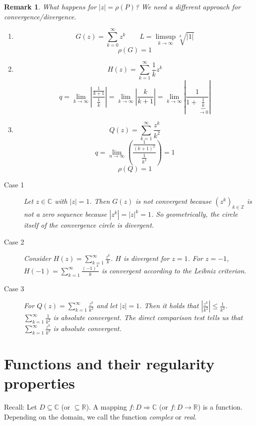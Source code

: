 \documentclass[a4paper,landscape,twocolumn]{article}
\newtheorem{rem}{Remark}
\newcommand\abs[1]{\left|#1\right|}
\begin{document}
\begin{rem}
  What happens for $\abs{z} = \rho(P)$?
  We need a different approach for convergence/divergence.
  \begin{enumerate}
    \item
      \[ G(z) = \sum_{k=0}^\infty z^k \qquad L = \limsup_{k\to\infty} \sqrt[k]{\abs{1}} \]
      \[ \rho(G) = 1 \]
    \item
      \[ H(z) = \sum_{k=1}^\infty \frac1k z^k \]
      \[
        q =
        \lim_{k\to\infty} \abs{\frac{\frac1{k+1}}{\frac1k}}
        = \lim_{k\to\infty} \abs{\frac{k}{k+1}}
        = \lim_{k\to\infty} \abs{\frac{1}{1 + \underbrace{\frac1k}_{\to0}}}
      \]
    \item
      \[ Q(z) = \sum_{k=1}^\infty \frac{z^k}{k^2} \]
      \[ q = \lim_{n\to\infty} \left(\frac{\frac{1}{(k+1)^2}}{\frac1{k^2}}\right) = 1 \]
      \[ \rho(Q) = 1 \]
  \end{enumerate}

  \begin{description}
    \item[Case 1]
      Let $z \in \mathbb C$ with $\abs{z} = 1$. Then $G(z)$ is not convergent
      because $(z^k)_{k\in\mathbb Z}$ is not a zero sequence because $\abs{z^k} = \abs{z}^k = 1$.
      So geometrically, the circle itself of the convergence circle is divergent.
    \item[Case 2]
      Consider $H(z) = \sum_{k=1}^\infty \frac{z^k}{k}$.
      $H$ is divergent for $z = 1$.
      For $z = -1$, $H(-1) = \sum_{k=1}^\infty \frac{(-1)^k}{k}$ is convergent according to the Leibniz criterion.
    \item[Case 3]
      For $Q(z) = \sum_{k=1}^\infty \frac{z^k}{k^2}$ and let $\abs{z} = 1$.
      Then it holds that $\abs{\frac{z^k}{k^2}} \leq \frac{1}{k^2}$.
      $\sum_{k=1}^\infty \frac{1}{k^2}$ is absolute convergent.
      The direct comparison test tells us that $\sum_{k=1}^\infty \frac{z^k}{k^2}$ is absolute convergent.
  \end{description}
\end{rem}

\section{Functions and their regularity properties}
%
Recall: Let $D \subseteq \mathbb C$ (or $\subseteq \mathbb R$).
A mapping $f: D \Rightarrow \mathbb C$ (or $f: D \rightarrow \mathbb R$)
is a function. Depending on the domain, we call the function \emph{complex}
or \emph{real}.
\end{document}

